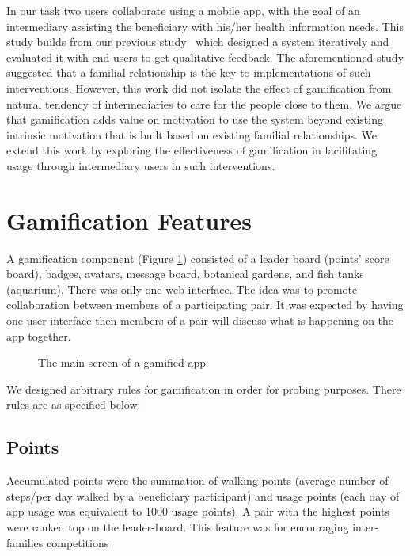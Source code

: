 \documentclass{sig-alternate}
\begin{document}
In our task two users collaborate using a mobile app, with the goal of an intermediary assisting the beneficiary with his/her health information needs. This study builds from our previous study~\cite{katule2016:leveraging} which designed a system iteratively and evaluated it with end users to get qualitative feedback. The aforementioned study suggested that a familial relationship is the key to implementations of such interventions. However, this work did not isolate the effect of gamification from natural tendency of intermediaries to care for the people close to them. We argue that gamification adds value on motivation to use the system beyond existing intrinsic motivation that is built based on existing familial relationships. We extend this work by exploring the effectiveness of gamification in facilitating usage through intermediary users in such interventions.

\section{Gamification Features}\label{gamfeatures}
A gamification component (Figure \ref{figure:gameapp}) consisted of a leader board (points' score board), badges, avatars, message board, botanical gardens, and fish tanks (aquarium). There was only one web interface. The idea was to promote collaboration between members of a participating pair. It was expected by having one user interface then members of a pair will discuss what is happening on the app together.

\begin{figure}[H]
\centering
{}
\caption{The main screen of a gamified app}
\label{figure:gameapp}
\end{figure} 

We designed arbitrary rules for gamification in order for probing purposes. There rules are as specified below:
\subsection*{\textbf{Points}}
Accumulated points were the summation of walking points (average number of steps/per day walked by a beneficiary participant) and usage points (each day of app usage was equivalent to 1000 usage points). A pair with the highest points were ranked top on the leader-board. This feature was for encouraging inter-families competitions
\end{document}
